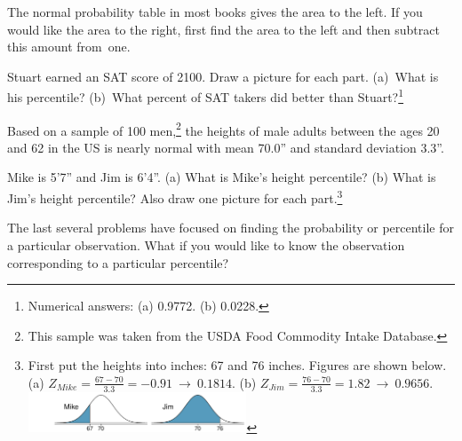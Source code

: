 \begin{tipBox}{
The normal probability table in most books gives the area to the left. If you would like the area to the right, first find the area to the left and then subtract this amount from~one.}
\end{tipBox}

\begin{exercise}
Stuart earned an SAT score of 2100. Draw a picture for each part. (a)~What is his percentile? (b)~What percent of SAT takers did better than Stuart?\footnote{Numerical answers: (a) 0.9772. (b) 0.0228.}
\end{exercise}

Based on a sample of 100 men,\footnote{This sample was taken from the USDA Food Commodity Intake Database.} the heights of male adults between the ages 20 and 62 in the US is nearly normal with mean 70.0'' and standard deviation 3.3''.

\begin{exercise}
Mike is 5'7'' and Jim is 6'4''. (a) What is Mike's height percentile? (b) What is Jim's height percentile? Also draw one picture for each part.\footnote{First put the heights into inches: 67 and 76 inches. Figures are shown below. (a) $Z_{Mike} = \frac{67 - 70}{3.3} = -0.91\ \to\ 0.1814$. (b) $Z_{Jim} = \frac{76 - 70}{3.3} = 1.82\ \to\ 0.9656$. \\\includegraphics[height=12mm]{02/figures/mikeAndJimPercentiles/mikeAndJimPercentiles}}
\end{exercise}

The last several problems have focused on finding the probability or percentile for a particular observation. What if you would like to know the observation corresponding to a particular percentile?

